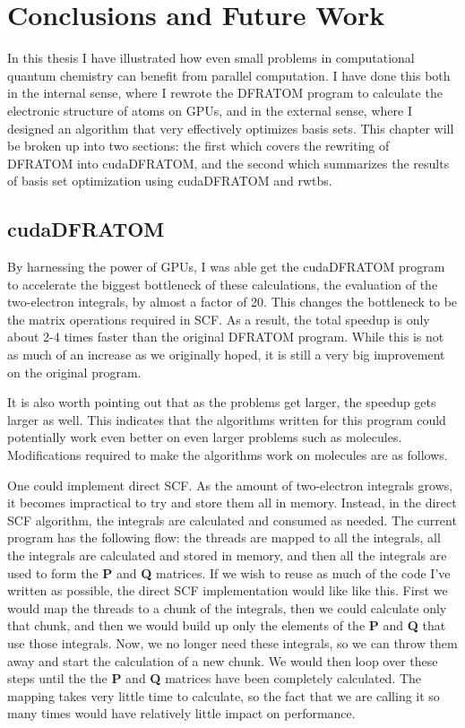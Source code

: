 \chapter{Conclusions and Future Work}

In this thesis I have illustrated how even small problems in computational quantum chemistry can benefit from parallel computation. I have done this both in the internal sense, where I rewrote the DFRATOM program to calculate the electronic structure of atoms on GPUs, and in the external sense, where I designed an algorithm that very effectively optimizes basis sets. This chapter will be broken up into two sections: the first which covers the rewriting of DFRATOM into cudaDFRATOM, and the second which summarizes the results of basis set optimization using cudaDFRATOM and rwtbs.

\section{cudaDFRATOM}
By harnessing the power of GPUs, I was able get the cudaDFRATOM program to accelerate the biggest bottleneck of these calculations, the evaluation of the two-electron integrals, by almost a factor of 20. This changes the bottleneck to be the matrix operations required in SCF. As a result, the total speedup is only about 2-4 times faster than the original DFRATOM program. While this is not as much of an increase as we originally hoped, it is still a very big improvement on the original program.

It is also worth pointing out that as the problems get larger, the speedup gets larger as well. This indicates that the algorithms written for this program could potentially work even better on even larger problems such as molecules. Modifications required to make the algorithms work on molecules are as follows. 

One could implement direct SCF. As the amount of two-electron integrals grows, it becomes impractical to try and store them all in memory. Instead, in the direct SCF algorithm, the integrals are calculated and consumed as needed. The current program has the following flow: the threads are mapped to all the integrals, all the integrals are calculated and stored in memory, and then all the integrals are used to form the \textbf{P} and \textbf{Q} matrices. If we wish to reuse as much of the code I've written as possible, the direct SCF implementation would like like this. First we would map the threads to a chunk of the integrals, then we could calculate only that chunk, and then we would build up only the elements of the \textbf{P} and \textbf{Q} that use those integrals. Now, we no longer need these integrals, so we can throw them away and start the calculation of a new chunk. We would then loop over these steps until the the \textbf{P} and \textbf{Q} matrices have been completely calculated. The mapping takes very little time to calculate, so the fact that we are calling it so many times would have relatively little impact on performance. 

